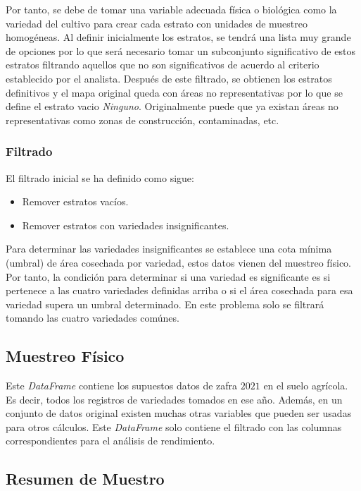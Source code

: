 \documentclass[conference]{IEEEtran}
\begin{document}
\bigbreak

Por tanto, se debe de tomar una variable adecuada física o biológica como la variedad del cultivo para crear cada estrato con unidades de muestreo homogéneas. Al definir inicialmente los estratos, se tendrá una lista muy grande de opciones por lo que será necesario tomar un subconjunto significativo de estos estratos filtrando aquellos que no son significativos de acuerdo al criterio establecido por el analista. Después de este filtrado, se obtienen los estratos definitivos y el mapa original queda con áreas no representativas por lo que se define el estrato vacio \textit{Ninguno}. Originalmente puede que ya existan áreas no representativas como zonas de construcción, contaminadas, etc.

\subsubsection{Filtrado}

El filtrado inicial se ha definido como sigue:

\begin{itemize}
    \item Remover estratos vacíos.
    \item Remover estratos con variedades insignificantes.
\end{itemize}

Para determinar las variedades insignificantes se establece una cota mínima (umbral) de área cosechada por variedad, estos datos vienen del muestreo físico. Por tanto, la condición para determinar si una variedad es significante es si pertenece a las cuatro variedades definidas arriba o si el área cosechada para esa variedad supera un umbral determinado. En este problema solo se filtrará tomando las cuatro variedades comúnes.

\subsection{Muestreo Físico}

Este \textit{DataFrame} contiene los supuestos datos de zafra $2021$ en el suelo agrícola. Es decir, todos los registros de variedades tomados en ese año. Además, en un conjunto de datos original existen muchas otras variables que pueden ser usadas para otros cálculos. Este \textit{DataFrame} solo contiene el filtrado con las columnas correspondientes para el análisis de rendimiento.

\subsection{Resumen de Muestro}
\end{document}
